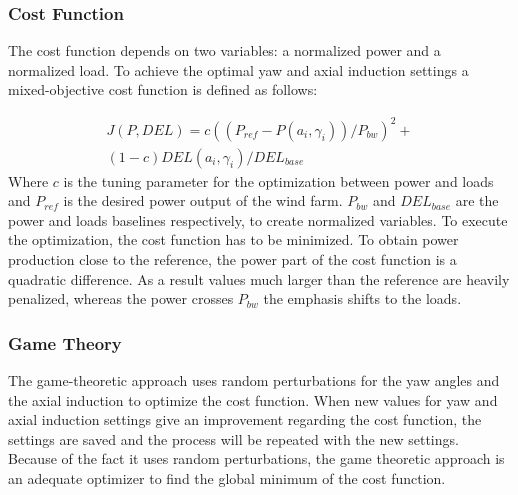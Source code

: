 \subsubsection{Cost Function} \label{sec:costfunction}
The cost function depends on two variables: a normalized power and a normalized load. To achieve the optimal yaw and axial induction settings a mixed-objective cost function is defined as follows:

\begin{equation}
\begin{aligned}
J(P,DEL) = c((P_{ref}-P(a_i,\gamma_i))/P_{bw})^2  + \\
(1-c)DEL(a_i,\gamma_i)/DEL_{base}
\end{aligned}
 \label{eq:costf}
\end{equation}
Where $c$ is the tuning parameter for the optimization between power and loads and $P_{ref}$ is the desired power output of the wind farm. $P_{bw}$ and $DEL_{base}$ are the power and loads baselines respectively, to create normalized variables.
\newline
To execute the optimization, the cost function has to be minimized. To obtain power production close to the reference, the power part of the cost function is a quadratic difference. As a result values much larger than the reference are heavily penalized, whereas the power crosses $P_{bw}$ the emphasis shifts to the loads.

\subsubsection{Game Theory} \label{sec:gametheory}
The game-theoretic approach uses random perturbations for the yaw angles and the axial induction to optimize the cost function. When new values for yaw and axial induction settings give an improvement regarding the cost function, the settings are saved and the process will be repeated with the new settings. Because of the fact it uses random perturbations, the game theoretic approach is an adequate optimizer to find the global minimum of the cost function.\cite{Dijk2016}




